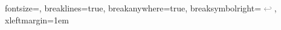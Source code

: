 \newenvironment{widetable}{\begin{adjustbox}{max width=\linewidth}}{\end{adjustbox}}

%
  {fontsize=\small, breaklines=true, breakanywhere=true,
   breaksymbolright=\textcolor{gray}{$\hookleftarrow$}, xleftmargin=1em}


\newcommand{\uV}{\si{\micro\volt}}
\newcommand{\cmd}[1]{\texttt{\small #1}}

